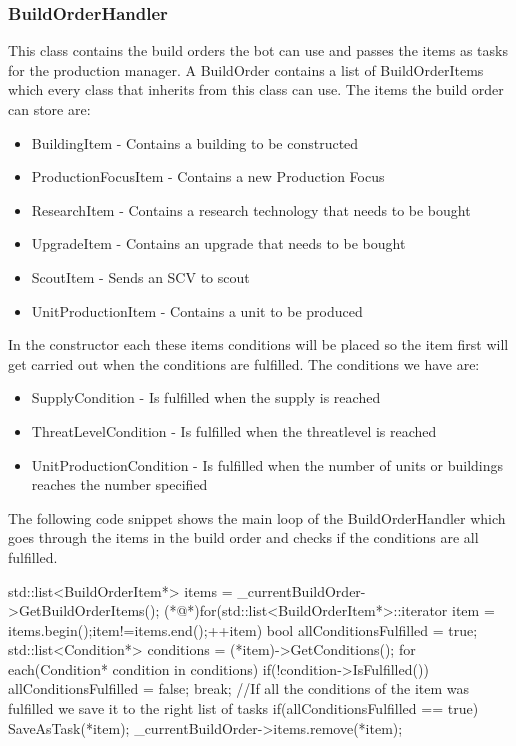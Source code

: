 		\subsubsection*{BuildOrderHandler}
			This class contains the build orders the bot can use and passes the items as tasks for the production manager. A BuildOrder contains a list of 
			BuildOrderItems which every class that inherits from this class can use. The items the build order can store are:
			\begin{itemize}
				\item BuildingItem - Contains a building to be constructed
				\item ProductionFocusItem - Contains a new Production Focus
				\item ResearchItem - Contains a research technology that needs to be bought
				\item UpgradeItem - Contains an upgrade that needs to be bought
				\item ScoutItem - Sends an SCV to scout
				\item UnitProductionItem - Contains a unit to be produced
			\end{itemize}
			In the constructor each these items conditions will be placed so the item first will get carried out when the conditions are fulfilled.
			The conditions we have are: 
			\begin{itemize}
				\item SupplyCondition - Is fulfilled when the supply is reached
				\item ThreatLevelCondition - Is fulfilled when the threatlevel is reached
				\item UnitProductionCondition - Is fulfilled when the number of units or buildings reaches the number specified
			\end{itemize}
			The following code snippet shows the main loop of the BuildOrderHandler which goes through the items in the build order and checks if the 
			conditions are all fulfilled.
			\pagebreak
				\begin{Sourcecode}[caption=BuildOrderHandler main loop]
		std::list<BuildOrderItem*> items = _currentBuildOrder->GetBuildOrderItems();
		(*@\lnote@*)for(std::list<BuildOrderItem*>::iterator item = items.begin();item!=items.end();++item)
		{
			bool allConditionsFulfilled = true;
			std::list<Condition*> conditions = (*item)->GetConditions();
			for each(Condition* condition in conditions)
			{
				if(!condition->IsFulfilled())
				{
					allConditionsFulfilled = false;
					break;
				}
			}
			//If all the conditions of the item was fulfilled we save it to the right list of tasks
			if(allConditionsFulfilled == true)
			{
				SaveAsTask(*item);				
				_currentBuildOrder->items.remove(*item);
			}
		}	
				\end{Sourcecode}
